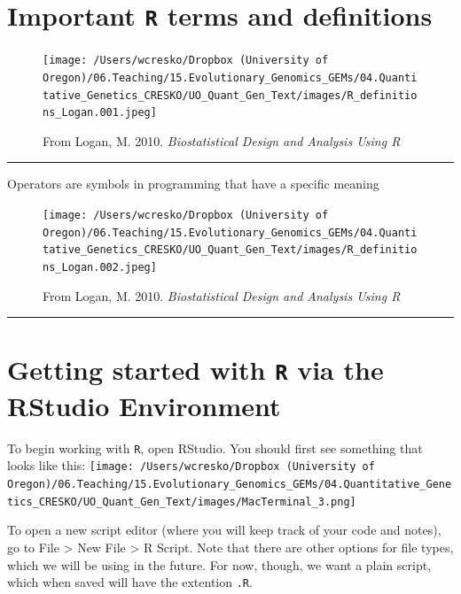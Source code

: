 \documentclass[
]{book}
\begin{document}
\hypertarget{important-r-terms-and-definitions}{%
\section{\texorpdfstring{Important \texttt{R} terms and definitions}{Important R terms and definitions}}\label{important-r-terms-and-definitions}}

\begin{figure}
\centering
\texttt{[image: /Users/wcresko/Dropbox (University of Oregon)/06.Teaching/15.Evolutionary\_Genomics\_GEMs/04.Quantitative\_Genetics\_CRESKO/UO\_Quant\_Gen\_Text/images/R\_definitions\_Logan.001.jpeg]}
\caption{From Logan, M. 2010. \emph{Biostatistical Design and Analysis Using R}}
\end{figure}

\begin{center}\rule{0.5\linewidth}{0.5pt}\end{center}

Operators are symbols in programming that have a specific meaning

\begin{figure}
\centering
\texttt{[image: /Users/wcresko/Dropbox (University of Oregon)/06.Teaching/15.Evolutionary\_Genomics\_GEMs/04.Quantitative\_Genetics\_CRESKO/UO\_Quant\_Gen\_Text/images/R\_definitions\_Logan.002.jpeg]}
\caption{From Logan, M. 2010. \emph{Biostatistical Design and Analysis Using R}}
\end{figure}

\begin{center}\rule{0.5\linewidth}{0.5pt}\end{center}

\hypertarget{getting-started-with-r-via-the-rstudio-environment}{%
\section{\texorpdfstring{Getting started with \texttt{R} via the RStudio Environment}{Getting started with R via the RStudio Environment}}\label{getting-started-with-r-via-the-rstudio-environment}}

To begin working with \texttt{R}, open RStudio. You should first see something that looks like this:
\texttt{[image: /Users/wcresko/Dropbox (University of Oregon)/06.Teaching/15.Evolutionary\_Genomics\_GEMs/04.Quantitative\_Genetics\_CRESKO/UO\_Quant\_Gen\_Text/images/MacTerminal\_3.png]}

To open a new script editor (where you will keep track of your code and notes), go to File \textgreater{} New File \textgreater{} R Script. Note that there are other options for file types, which we will be using in the future. For now, though, we want a plain script, which when saved will have the extention \texttt{.R}.
\end{document}
